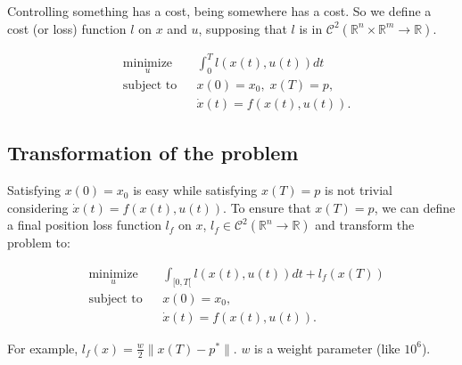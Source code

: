 \documentclass{report}
\begin{document}
Controlling something has a cost, being somewhere has a cost. So we define a cost (or loss) function $l$ on $x$ and $u$, supposing that $l$ is in $\mathscr{C}^2(\mathbb{R}^n \times \mathbb{R}^m \to \mathbb{R})$.
 

\begin{equation}
\begin{aligned}
& \underset{u}{\text{minimize}}
& & \int_0^T l(x(t),u(t)) dt \\
& \text{subject to}
& & x(0) = x_0, \; x(T) = p, \\
&&& \dot{x} (t) = f(x(t), u(t)).
\end{aligned}
\end{equation}

%

\subsection{Transformation of the problem}

Satisfying $x(0) = x_0$ is easy while satisfying $x(T) = p$ is not trivial considering $\dot{x} (t) = f(x(t), u(t))$. To ensure that $x(T)= p$, we can define a final position loss function $l_f$ on $x$, $l_f \in \mathscr{C}^2(\mathbb{R}^n \to \mathbb{R})$ and transform the problem to: 

\begin{equation}
\begin{aligned}
& \underset{u}{\text{minimize}}
& & \int_{[0,T[} l(x(t),u(t)) dt + l_f(x(T)) \\
& \text{subject to}
& & x(0) = x_0,  \\
&&& \dot{x} (t) = f(x(t), u(t)).
\end{aligned}
\end{equation}
     
     For example, $l_f(x) = \frac{w}{2} \|x(T) - p^*\|$. $w$ is a weight parameter (like $10^6$).
     
     
\end{document}
